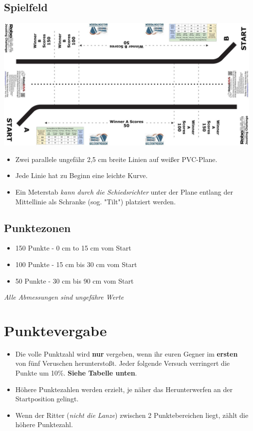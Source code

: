 \documentclass[a4paper,12pt]{article}
\begin{document}
\subsection{Spielfeld}
\includegraphics[width=1\textwidth]{track.png}
\begin{itemize}
	\item Zwei parallele ungefähr 2,5 cm breite Linien auf weißer PVC-Plane.
	\item Jede Linie hat zu Beginn eine leichte Kurve.
	\item Ein Meterstab \emph{kann durch die Schiedsrichter} unter der
		Plane entlang der Mittellinie als Schranke (sog. "Tilt")
		platziert werden.
\end{itemize}
\subsection{Punktezonen}
\begin{itemize}
	\item 150 Punkte - 0 cm to 15 cm vom Start
	\item 100 Punkte - 15 cm bis 30 cm vom Start
	\item  50 Punkte - 30 cm bis 90 cm vom Start
\end{itemize}
\begin{center}
	\emph{Alle Abmessungen sind ungefähre Werte}
\end{center}
\section{Punktevergabe}
\begin{itemize}
	\item Die volle Punktzahl wird \textbf{nur} vergeben, wenn ihr euren
		Gegner im \textbf{ersten} von fünf Veruschen herunterstoßt.
		Jeder folgende Versuch verringert die Punkte um 10\%.
		\textbf{Siehe Tabelle unten}.
	\item Höhere Punktezahlen werden erzielt, je näher das Herunterwerfen
		an der Startposition gelingt.
	\item Wenn der Ritter (\emph{nicht die Lanze}) zwischen 2
		Punktebereichen liegt, zählt die höhere Punktezahl.
\end{itemize}
\end{document}
